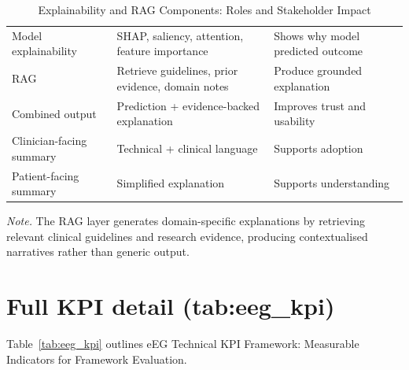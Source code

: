 {\tablestripes\tablefontsize
{}
\begin{xltabular}{\textwidth}{@{} l L L @{}}
\caption[Explainability and RAG Components]{Explainability and RAG Components: Roles and Stakeholder Impact}\label{tab:explainability_rag} \\
\toprule
{} &  &  \\
\midrule
\endfirsthead
\endhead
\bottomrule
\endlastfoot
Model explainability & SHAP, saliency, attention, feature importance & Shows why model predicted outcome \\
RAG & Retrieve guidelines, prior evidence, domain notes & Produce grounded explanation \\
Combined output & Prediction + evidence-backed explanation & Improves trust and usability \\
Clinician-facing summary & Technical + clinical language & Supports adoption \\
Patient-facing summary & Simplified explanation & Supports understanding \\
\end{xltabular}}
\vspace{2pt}
\noindent\textit{Note.} The RAG layer generates domain-specific explanations by retrieving relevant clinical guidelines and research evidence, producing contextualised narratives rather than generic output.


\section{Full KPI detail (tab:eeg\_\allowbreak kpi)}
\label{sec:appendix_ch4_tab_eeg_kpi}

\iffalse %
\noindent Table~\ref{tab:eeg_kpi} outlines eEG Technical KPI Framework: Measurable Indicators for Framework Evaluation.

